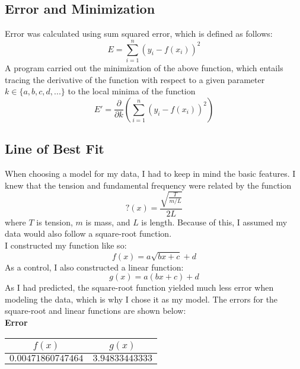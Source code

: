 \documentclass[a4paper]{article}
\begin{document}
        \subsection{Error and Minimization}
            \begin{center}
                Error was calculated using sum squared error, which is defined as follows:
                \begin{equation}
                    E=\displaystyle\sum_{i=1}^n{(y_i-f(x_i))^2}
                \end{equation}
                A program carried out the minimization of the above function, which entails
                tracing the derivative of the function with respect to a given parameter
                $k \in \{a, b, c, d, ...\}$ to the local minima of the function
                \begin{equation}
                    E'=\frac{\partial}{\partial k}(\displaystyle\sum_{i=1}^n{(y_i-f(x_i))^2})
                \end{equation}
            \end{center}
        \subsection{Line of Best Fit}
            \begin{center}
                When choosing a model for my data, I had to keep in mind the basic
                features.  I knew that the tension and fundamental frequency were related
                by the function
                \begin{equation}
                    ?(x)=\frac{\sqrt{\frac{T}{m/L}}}{2L}
                \end{equation}
                where $T$ is tension, $m$ is mass, and $L$ is length. Because of this,
                I assumed my data would also follow a square-root function.
                \\
                I constructed my function like so:
                \begin{equation}
                    f(x)=a\sqrt{bx+c}+d
                \end{equation}
                As a control, I also constructed a linear function:
                \begin{equation}
                    g(x)=a(bx+c)+d
                \end{equation}
                As I had predicted, the square-root function yielded much less error
                when modeling the data, which is why I chose it as my model. The errors
                for the square-root and linear functions are shown below:
                \\
                \bf{Error}
                \\
                \begin{tabular}{|c|c|}
                    \hline
                    $f(x)$ & $g(x)$
                    \\\hline
                    $\num[round-precision=5]{0.00471860747464}$ & $\num[round-precision=5]{3.94833443333}$
                \end{tabular}
            \end{center}
\end{document}
